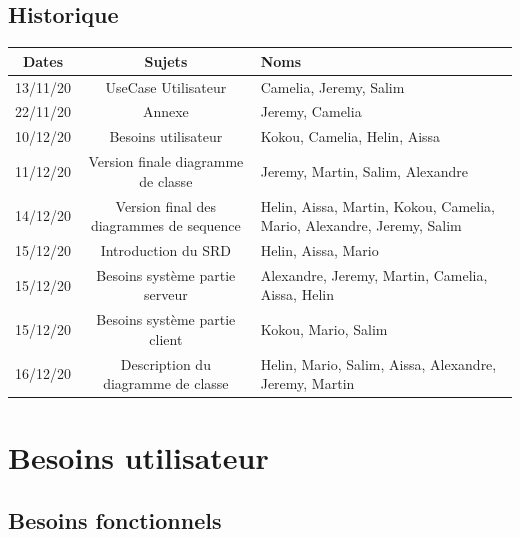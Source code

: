 \documentclass[a4paper,12pt]{article}
\begin{document}
\subsection{Historique}
\begin{tabularx}{15cm}{|c|c|X|}
	\hline
		Dates & Sujets & Noms \\
	\hline
		13/11/20 & UseCase Utilisateur & Camelia, Jeremy, Salim \\
	\hline
		22/11/20 & Annexe & Jeremy, Camelia \\
	\hline
		10/12/20 & Besoins utilisateur & Kokou, Camelia, Helin, Aissa\\
	\hline
		11/12/20 & Version finale diagramme de classe  & Jeremy, Martin, Salim, Alexandre\\
	\hline
		14/12/20 & Version final des diagrammes de sequence & Helin, Aissa, Martin, Kokou, Camelia, 
		Mario, Alexandre, Jeremy, Salim\\
	\hline
		15/12/20 & Introduction du SRD & Helin, Aissa, Mario\\
	\hline
		15/12/20 & Besoins système partie serveur & Alexandre, Jeremy, Martin, Camelia, Aissa, Helin\\
	\hline
		15/12/20 & Besoins système partie client & Kokou, Mario, Salim\\
	\hline
		16/12/20 & Description du diagramme de classe & Helin, Mario, Salim, Aissa,
		Alexandre, Jeremy, Martin\\
	\hline

\end{tabularx}

\section{Besoins utilisateur}

\subsection{Besoins fonctionnels}

\end{document}
